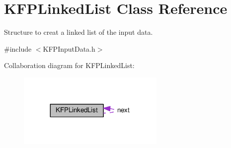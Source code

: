 \hypertarget{structKFPLinkedList}{}\section{K\+F\+P\+Linked\+List Class Reference}
\label{structKFPLinkedList}


Structure to creat a linked list of the input data.  




{\ttfamily \#include $<$K\+F\+P\+Input\+Data.\+h$>$}



Collaboration diagram for K\+F\+P\+Linked\+List\+:\nopagebreak
\begin{figure}[H]
\begin{center}
\leavevmode
\includegraphics[width=200pt]{structKFPLinkedList__coll__graph}
\end{center}
\end{figure}
